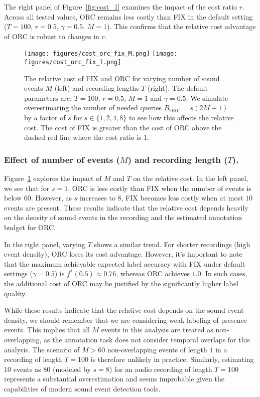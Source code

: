 The right panel of Figure~\ref{fig:cost_1} examines the impact of the cost ratio $r$. Across all tested values, ORC remains less costly than FIX in the default setting ($T=100$, $r=0.5$, $\gamma=0.5$, $M=1$). This confirms that the relative cost advantage of ORC is robust to changes in $r$.

\begin{figure}
    \centering
    \texttt{[image: figures/cost\_orc\_fix\_M.png]}
    \texttt{[image: figures/cost\_orc\_fix\_T.png]}
    \caption{The relative cost of FIX and ORC for varying number of sound events $M$ (left) and recording lengths $T$ (right). The default parameters are: $T=100$, $r=0.5$, $M=1$ and $\gamma=0.5$. We simulate overestimating the number of needed queries $B_{\text{ORC}} = s(2M+1)$ by a factor of $s$ for $s \in \{1, 2, 4, 8\}$ to see how this affects the relative cost. The cost of FIX is greater than the cost of ORC above the dashed red line where the cost ratio is $1$.}
    \label{fig:cost_2}
\end{figure}

\subsubsection{Effect of number of events ($M$) and recording length ($T$).} Figure~\ref{fig:cost_2} explores the impact of $M$ and $T$ on the relative cost. In the left panel, we see that for $s=1$, ORC is less costly than FIX when the number of events is below $60$. However, as $s$ increases to $8$, FIX becomes less costly when at most $10$ events are present. These results indicate that the relative cost depends heavily on the density of sound events in the recording and the estimated annotation budget for ORC. 

In the right panel, varying $T$ shows a similar trend. For shorter recordings (high event density), ORC loses its cost advantage. However, it’s important to note that the maximum achievable expected label accuracy with FIX under default settings ($\gamma=0.5$) is $f^*(0.5) \approx 0.76$, whereas ORC achieves $1.0$. In such cases, the additional cost of ORC may be justified by the significantly higher label quality.

While these results indicate that the relative cost depends on the sound event density, we should remember that we are considering weak labeling of presence events. This implies that all $M$ events in this analysis are treated as non-overlapping, as the annotation task does not consider temporal overlaps for this analysis. The scenario of $M > 60$ non-overlapping events of length $1$ in a recording of length $T=100$ is therefore unlikely in practice. Similarly, estimating $10$ events as $80$ (modeled by $s=8$) for an audio recording of length $T=100$ represents a substantial overestimation and seems improbable given the capabilities of modern sound event detection tools. %